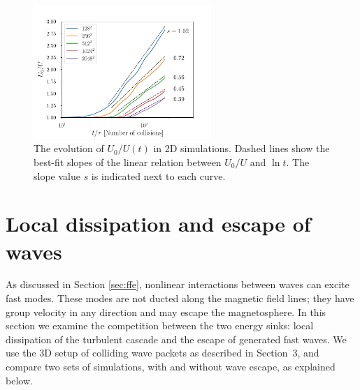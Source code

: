 \begin{figure}[h]
\centering
\includegraphics[width=0.6\textwidth]{pics/chap4/model2D}
\caption[The evolution of $U_0/U(t)$ in 2D simulations]{ 
The evolution of $U_0/U(t)$ in 2D simulations. Dashed lines show the best-fit slopes of the linear relation between $U_0/U$ and $\ln t$. The slope value $s$ is indicated next to each curve.}
\label{fit}
\end{figure}

\section{Local dissipation and escape of waves}
\label{sec:fate}

As discussed in Section \ref{sec:ffe}, nonlinear interactions between \alfven waves can excite fast modes. These modes are not ducted along the magnetic field lines; they have group velocity in any direction and may escape the magnetosphere. 
In this section we examine the competition between the two energy sinks: local dissipation of the turbulent cascade and the escape of generated fast waves. 
We use the 3D setup of colliding \alfven wave packets as described in Section~3, and compare two sets of simulations, with and without wave escape, as explained below.
%
